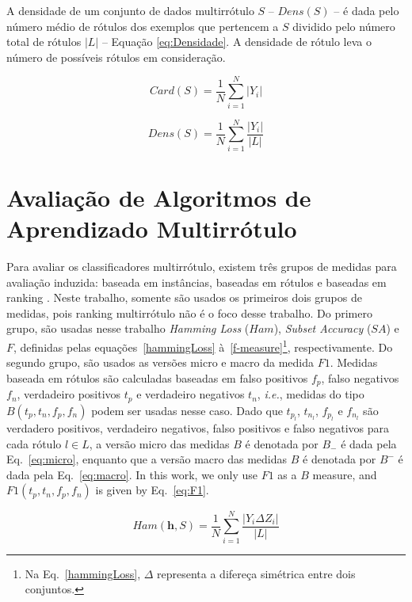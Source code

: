 A densidade de um conjunto de dados multirrótulo $S$ – $Dens(S)$ – é dada pelo número médio de rótulos dos exemplos que pertencem a $S$ dividido pelo número total de rótulos $|L|$ – Equação \ref{eq:Densidade}. A densidade de rótulo leva o número de possíveis rótulos em consideração.

\begin{equation}\label{eq:Cardinalidade}
    Card(S) = \frac{1}{N}\sum_{i=1}^{N}{|Y_i|}
\end{equation}

\begin{equation}\label{eq:Densidade}
    Dens(S) = \frac{1}{N}\sum_{i=1}^{N}{\frac{|Y_i|}{|L|}}
\end{equation}

\section {Avaliação de Algoritmos de Aprendizado Multirrótulo}

Para avaliar os classificadores multirrótulo, existem três grupos de medidas para avaliação induzida:
baseada em instâncias, baseadas em rótulos e baseadas em ranking \cite{dimou2009empirical}. Neste trabalho, somente são usados os primeiros dois grupos de medidas, pois ranking multirrótulo não é o foco desse trabalho. Do primero grupo, são usadas nesse trabalho \textit{Hamming Loss} ($Ham$), \textit{Subset Accuracy} ($SA$) e $F$, definidas pelas equações~\ref{hammingLoss} à~\ref{f-measure}\footnote{Na Eq.~\ref{hammingLoss}, $\Delta$ representa a difereça simétrica entre dois conjuntos.}, respectivamente. Do segundo grupo, são usados as versões micro e macro da medida $F1$. Medidas baseada em rótulos são calculadas baseadas em falso positivos $f_p$, falso negativos $f_n$, verdadeiro positivos $t_p$ e verdadeiro negativos $t_n$, \textit{i.e.}, medidas do tipo $B(t_p, t_n, f_p, f_n)$ podem ser usadas nesse caso. Dado que $t_{p_l}$, $t_{n_l}$, $f_{p_l}$ e $f_{n_l}$ são verdadero positivos, verdadeiro negativos, falso positivos e falso negativos para cada rótulo $l \in L$, a versão micro das medidas $B$ é denotada por $B_{-}$ é dada pela Eq.~\ref{eq:micro}, enquanto que a versão macro das medidas $B$ é denotada por $B^{-}$ é dada pela Eq.~\ref{eq:macro}. In this work, we only use $F1$ as a $B$ measure, and $F1(t_p, t_n, f_p, f_n)$ is given by Eq.~\ref{eq:F1}.

\begin{equation}\label{hammingLoss}
    Ham(\mathbf{h},S) = \frac{1}{N}\sum_{i=1}^{N}\frac{|Y_i\Delta Z_i|}{|L|}
\end{equation}

